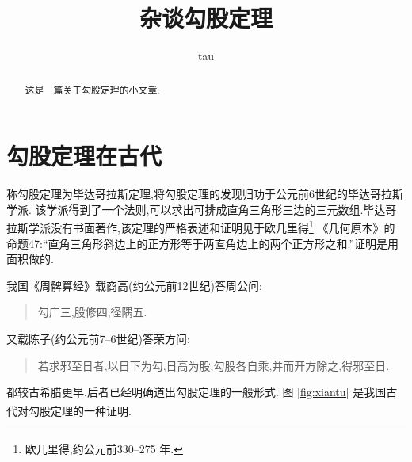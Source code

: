 \documentclass[UTF8,a4paper,8pt,no-math]{article} %
\title{杂谈勾股定理}
\author{tau}
\numberwithin{equation}{section} %
\newcommand{\upcite}[1]{\textsuperscript{\cite{#1}}}  %
\begin{document}

\maketitle            %
\tableofcontents      %

\begin{abstract}      %
	这是一篇关于勾股定理的小文章.
\end{abstract}

{\color{NavyBlue}\section{勾股定理在古代}}   %
称勾股定理为毕达哥拉斯定理,将勾股定理的发现归功于公元前6世纪的毕达哥拉斯学派.\cite{Kline}
该学派得到了一个法则,可以求出可排成直角三角形三边的三元数组.毕达哥拉斯学派没有书面著作,该定理的严格表述和证明见于欧几里得\footnote{欧几里得,约公元前330--275 年.}%
《几何原本》的命题47:“直角三角形斜边上的正方形等于两直角边上的两个正方形之和.”证明是用面积做的.

我国《周髀算经》载商高(约公元前12世纪)答周公问:
\begin{quote}      %
	\kaishu  %
	勾广三,股修四,径隅五.
\end{quote}
又载陈子(约公元前7--6世纪)答荣方问:
\begin{quote}
	\kaishu
	若求邪至日者,以日下为勾,日高为股,勾股各自乘,并而开方除之,得邪至日.
\end{quote}
都较古希腊更早.后者已经明确道出勾股定理的一般形式.
图 \ref{fig:xiantu} 是我国古代对勾股定理的一种证明\upcite{quanjing}.
\end{document}
